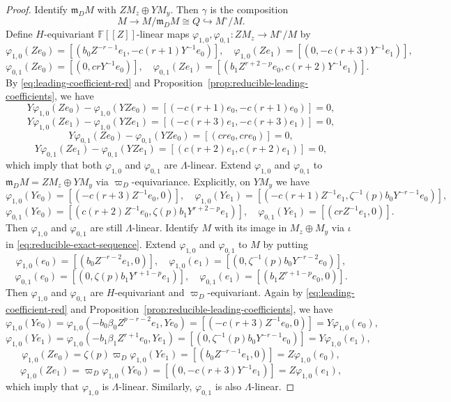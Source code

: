 \documentclass[11pt,a4paper]{article} %
\def\FF{\mathbb{F}}
\begin{document}
\begin{proof}
Identify $\mathfrak m_D M$ with $ZM_z\oplus YM_y$. Then $\gamma$ is the composition
\[
M\longrightarrow M/\mathfrak m_D M
\cong Q\hookrightarrow M^\circ/M.
\]
Define $H$-equivariant $\FF[[Z]]$-linear maps
$\varphi_{1,0},\varphi_{0,1}:ZM_z\longrightarrow M^\circ/M$ by
\[
\varphi_{1,0}(Ze_0)=\left[(b_0Z^{-r-1}e_1,-c(r+1)Y^{-1}e_0)\right],\quad\varphi_{1,0}(Ze_1)=\left[(0,-c(r+3)Y^{-1}e_1)\right],
\]
\[
\varphi_{0,1}(Ze_0)=\left[(0,crY^{-1}e_0)\right],\quad\varphi_{0,1}(Ze_1)=\left[(b_1Z^{r+2-p}e_0,c(r+2)Y^{-1}e_1)\right].
\]
By \eqref{eq:leading-coefficient-red} and Proposition~\ref{prop:reducible-leading-coefficients}, we have
\[
Y\varphi_{1,0}(Ze_0)-\varphi_{1,0}(YZe_0)=\left[(-c(r+1)e_0,-c(r+1)e_0)\right]=0,
\]
\[
Y\varphi_{1,0}(Ze_1)-\varphi_{1,0}(YZe_1)=\left[(-c(r+3)e_1,-c(r+3)e_1)\right]=0,
\]
\[
Y\varphi_{0,1}(Ze_0)-\varphi_{0,1}(YZe_0)=\left[(cr e_0,cr e_0)\right]=0,
\]
\[
Y\varphi_{0,1}(Ze_1)-\varphi_{0,1}(YZe_1)=\left[(c(r+2)e_1,c(r+2)e_1)\right]=0,
\]
which imply that both $\varphi_{1,0}$ and $\varphi_{0,1}$ are $\Lambda$-linear.
Extend $\varphi_{1,0}$ and $\varphi_{0,1}$ to $\mathfrak m_D M=ZM_z\oplus YM_y$ via $\varpi_D$-equivariance. Explicitly, on $YM_y$ we have 
\[
\varphi_{1,0}(Ye_0)=\left[(-c(r+3)Z^{-1}e_0,0)\right],\quad\varphi_{1,0}(Ye_1)=\left[(-c(r+1)Z^{-1}e_1,\zeta^{-1}(p)b_0Y^{-r-1}e_0)\right],
\]
\[
\varphi_{0,1}(Ye_0)=\left[(c(r+2)Z^{-1}e_0,\zeta(p)b_1Y^{r+2-p}e_1)\right],\quad\varphi_{0,1}(Ye_1)=\left[(crZ^{-1}e_1,0)\right].
\]
Then $\varphi_{1,0}$ and $\varphi_{0,1}$ are still $\Lambda$-linear. Identify $M$ with its image in $M_z\oplus M_y$ via $\iota$ in \eqref{eq:reducible-exact-sequence}. Extend $\varphi_{1,0}$ and $\varphi_{0,1}$ to $M$ by putting
\[
\varphi_{1,0}(e_0)
=\left[(b_0Z^{-r-2}e_1,
0)\right],\quad
\varphi_{1,0}(e_1)
=\left[\left(0,\zeta^{-1}(p)b_0Y^{-r-2}e_0\right)\right],
\]
\[
\varphi_{0,1}(e_0)
=\left[\left(0,\zeta(p)b_1Y^{r+1-p}e_1\right)\right],\quad
\varphi_{0,1}(e_1)
=\left[(b_1Z^{r+1-p}e_0,0)\right].
\]
Then $\varphi_{1,0}$ and $\varphi_{0,1}$ are $H$-equivariant and $\varpi_D$-equivariant. Again by \eqref{eq:leading-coefficient-red} and Proposition~\ref{prop:reducible-leading-coefficients}, we have
\[
\varphi_{1,0}(Ye_0)=\varphi_{1,0}(-b_0\beta_0Z^{p-r-2}e_1,Ye_0)=\left[\left(-c(r+3)Z^{-1}e_0,0\right)\right]=Y\varphi_{1,0}(e_0),
\]
\[
\varphi_{1,0}(Ye_1)=\varphi_{1,0}(-b_1\beta_1Z^{r+1}e_0,Ye_1)=\left[\left(0,\zeta^{-1}(p)b_0Y^{-r-1}e_0\right)\right]=Y\varphi_{1,0}(e_1),
\]
\[
\varphi_{1,0}(Ze_0)=\zeta(p)\varpi_D\varphi_{1,0}(Ye_1)=\left[(b_0Z^{-r-1}e_1,0)\right]=Z\varphi_{1,0}(e_0),
\]
\[
\varphi_{1,0}(Ze_1)=\varpi_D\varphi_{1,0}(Ye_0)=\left[\left(0,-c(r+3)Y^{-1}e_1\right)\right]=Z\varphi_{1,0}(e_1),
\]
which imply that $\varphi_{1,0}$ is $\Lambda$-linear. Similarly, $\varphi_{0,1}$ is also $\Lambda$-linear.


\end{proof}
\end{document}
